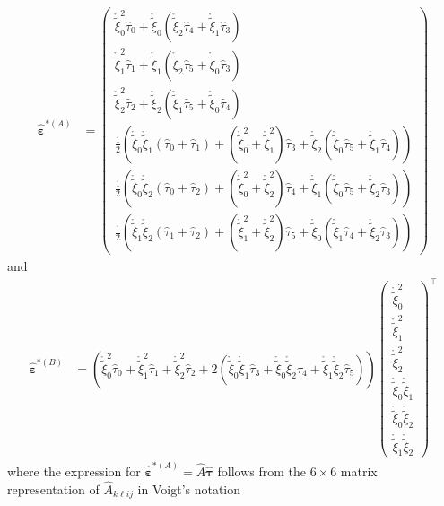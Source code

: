 \documentclass[11pt]{article}
\renewcommand{\vec}[1]{\boldsymbol{#1}}
\newcommand{\xir}{\mathring{\widetilde{\xi}}}
\begin{document}
\begin{equation}
\begin{aligned}    
    \widehat{\vec{\varepsilon}}^{*(A)} &= \begin{pmatrix}
    \xir_0^2 \widehat{\tau}_0 + \xir_0(\xir_2\widehat{\tau}_4+\xir_1\widehat{\tau}_3)\\[2ex]
    \xir_1^2 \widehat{\tau}_1 + \xir_1(\xir_2\widehat{\tau}_5+\xir_0\widehat{\tau}_3)\\[2ex]
    \xir_2^2 \widehat{\tau}_2 + \xir_2(\xir_1\widehat{\tau}_5+\xir_0\widehat{\tau}_4)\\[2ex]
    \frac{1}{2}\left(\xir_0\xir_1(\widehat{\tau}_0+\widehat{\tau}_1)+(\xir_0^2+\xir_1^2)\widehat{\tau}_3+\xir_2(\xir_0\widehat{\tau}_5+\xir_1\widehat{\tau}_4)\right)\\[2ex]
    \frac{1}{2}\left(\xir_0\xir_2(\widehat{\tau}_0+\widehat{\tau}_2)+(\xir_0^2+\xir_2^2)\widehat{\tau}_4+\xir_1(\xir_0\widehat{\tau}_5+\xir_2\widehat{\tau}_3)\right)\\[2ex]
    \frac{1}{2}\left(\xir_1\xir_2(\widehat{\tau}_1+\widehat{\tau}_2)+(\xir_1^2+\xir_2^2)\widehat{\tau}_5+\xir_0(\xir_1\widehat{\tau}_4+\xir_2\widehat{\tau}_3)\right)
    \end{pmatrix}
\end{aligned}
\end{equation}
and
\begin{equation}
\begin{aligned}    
    \widehat{\vec{\varepsilon}}^{*(B)} &= 
    \left(
    \xir_0^2\widehat{\tau}_0+ \xir_1^2\widehat{\tau}_1+ \xir_2^2\widehat{\tau}_2+ 2(\xir_0\xir_1\widehat{\tau}_3+ \xir_0 \xir_2\widehat{\tau}_4+\xir_1\xir_2\widehat{\tau}_5)
    \right)\begin{pmatrix}
    \xir_0^2 \\[2ex] \xir_1^2 \\[2ex] \xir_2^2 \\[2ex] \xir_0\xir_1 \\[2ex] \xir_0 \xir_2 \\[2ex] \xir_1\xir_2
    \end{pmatrix}^\top 
\end{aligned}
\end{equation}
where the expression for $\widehat{\vec{\varepsilon}}^{*(A)}=\widehat{A}\widehat{\vec{\tau}}$ follows from the $6\times 6$ matrix representation of $\widehat{A}_{k\ell ij}$ in Voigt's notation
\end{document}
